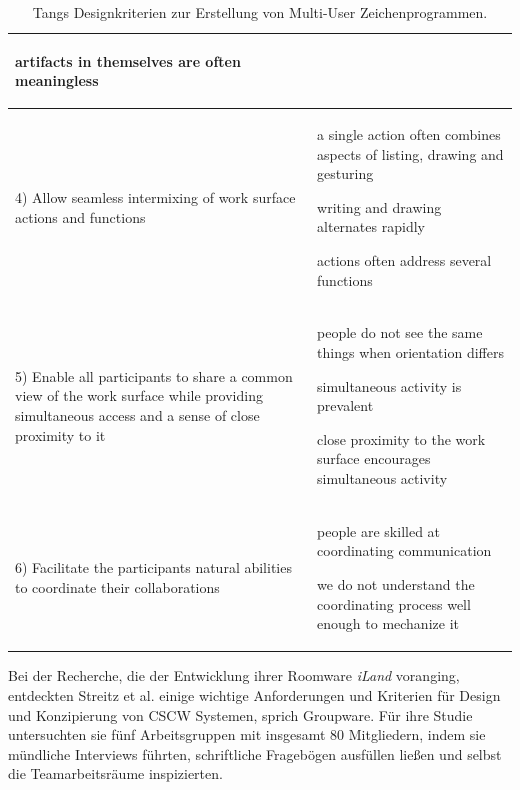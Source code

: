 \begin{table}
\begin{tabularx}{\textwidth}{p{5cm}X}
{\begin{compactitem}
		\item artifacts in themselves are often meaningless 
	\end{compactitem} }
	\\ [-12pt] \hline
	\small{
	4) 
	Allow seamless intermixing of work surface actions and functions} & \small{ 
	\begin{compactitem}
		\item a single action often combines aspects of listing, drawing and gesturing %
		\item writing and drawing alternates rapidly %
		\item actions often address several functions 
	\end{compactitem} }
	\\ [-12pt] \hline
	\small{
	5) 
	Enable all participants to share a common view of the work surface while providing simultaneous access and a sense of close proximity to it} & \small{ 
	\begin{compactitem}
		\item people do not see the same things when orientation differs %
		\item simultaneous activity is prevalent %
		\item close proximity to the work surface encourages simultaneous activity 
	\end{compactitem} }
	\\ [-12pt] \hline
	\small{
	6) 
	Facilitate the participants natural abilities to coordinate their collaborations} & \small{ 
	\begin{compactitem}
		\item people are skilled at coordinating communication %
		\item we do not understand the coordinating process well enough to mechanize it 
	\end{compactitem} }
	\\ [-12pt] \bottomrule
\end{tabularx}
  \caption[Tangs Designkriterien \newline \citep{TangJC:1989}]{Tangs Designkriterien zur Erstellung von Multi-User Zeichenprogrammen.}
  \label{tab:tangDesignKriterien}
\end{table}

\bigskip Bei der Recherche, die der Entwicklung ihrer Roomware \emph{iLand} \citep{Streitz:1998p198} voranging, entdeckten Streitz et al. einige wichtige Anforderungen und Kriterien für Design und Konzipierung von \ac{CSCW} Systemen, sprich Groupware. Für ihre Studie untersuchten sie fünf Arbeitsgruppen mit insgesamt 80 Mitgliedern, indem sie mündliche Interviews führten, schriftliche Fragebögen ausfüllen ließen und selbst die Teamarbeitsräume inspizierten.

